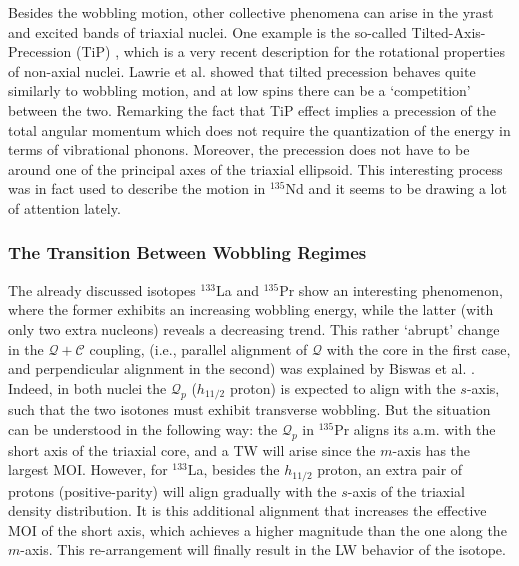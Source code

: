 Besides the wobbling motion, other collective phenomena can arise in the yrast and excited bands of triaxial nuclei. One example is the so-called Tilted-Axis-Precession (TiP) \cite{lawrie2020tilted}, which is a very recent description for the rotational properties of non-axial nuclei. Lawrie et al. showed that tilted precession behaves quite similarly to wobbling motion, and at low spins there can be a `competition' between the two. Remarking the fact that TiP effect implies a precession of the total angular momentum which does not require the quantization of the energy in terms of vibrational phonons. Moreover, the precession does not have to be around one of the principal axes of the triaxial ellipsoid. This interesting process was in fact used to describe the motion in $^{135}$Nd \cite{lv2021tilted} and it seems to be drawing a lot of attention lately.

\subsubsection*{The Transition Between Wobbling Regimes}

The already discussed isotopes $^{133}$La and $^{135}$Pr show an interesting phenomenon, where the former exhibits an increasing wobbling energy, while the latter (with only two extra nucleons) reveals a decreasing trend. This rather `abrupt' change in the $\mathcal{Q}+\mathscr{C}$ coupling, (i.e., parallel alignment of $\mathcal{Q}$ with the core in the first case, and perpendicular alignment in the second) was explained by Biswas et al. \cite{biswas2019longitudinal}. Indeed, in both nuclei the $\mathcal{Q}_p$ ($h_{11/2}$ proton) is expected to align with the $s$-axis, such that the two isotones must exhibit transverse wobbling. But the situation can be understood in the following way: the $\mathcal{Q}_p$ in $^{135}$Pr aligns its a.m. with the short axis of the triaxial core, and a TW will arise since the $m$-axis has the largest MOI. However, for $^{133}$La, besides the $h_{11/2}$ proton, an extra pair of protons (positive-parity) will align gradually with the $s$-axis of the triaxial density distribution. It is this additional alignment that increases the effective MOI of the short axis, which achieves a higher magnitude than the one along the $m$-axis. This re-arrangement will finally result in the LW behavior of the isotope.

